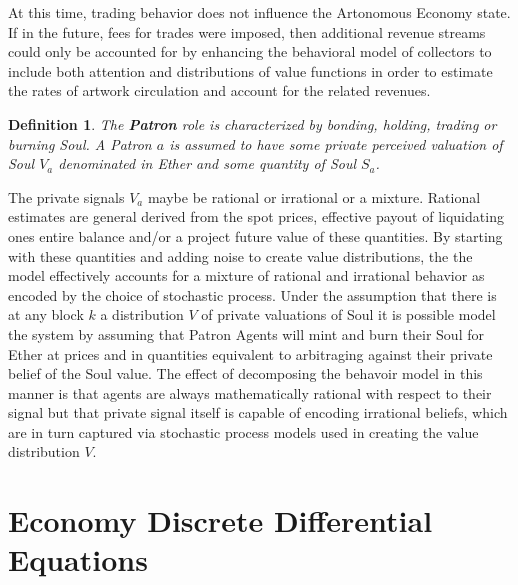 \documentclass[11pt]{amsart}
\newtheorem{definition}{Definition}
\begin{document}
At this time, trading behavior does not influence the Artonomous Economy state. If in the future, fees for trades were imposed, then additional revenue streams could only be accounted for by enhancing the behavioral model of collectors to include both attention and distributions of value functions in order to estimate the rates of artwork circulation and account for the related revenues.

\begin{definition}
The \textbf{Patron} role is characterized by bonding, holding, trading or burning Soul.  A Patron $a$ is assumed to have some private perceived valuation of Soul $V_a$ denominated in Ether and some quantity of Soul $S_a$.  
\end{definition}

The private signals $V_a$ maybe be rational or irrational or a mixture. Rational estimates are general derived from the spot prices, effective payout of liquidating ones entire balance and/or a project future value of these quantities. By starting with these quantities and adding noise to create value distributions, the the model effectively accounts for a mixture of rational and irrational behavior as encoded by the choice of stochastic process. Under the assumption that there is at any block $k$ a distribution $V$ of private valuations of Soul it is possible model the system by assuming that Patron Agents will  mint and burn their Soul for Ether at prices and in quantities equivalent to arbitraging against their private belief of the Soul value. The effect of decomposing the behavoir model in this manner is that agents are always mathematically rational with respect to their signal but that private signal itself is capable of encoding irrational beliefs, which are in turn captured via stochastic process models used in creating the value distribution $V$.


\section{Economy Discrete Differential Equations}
\end{document}
